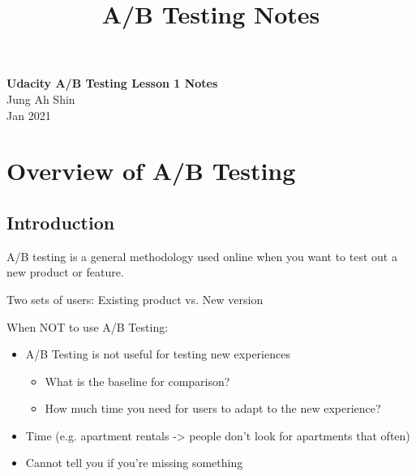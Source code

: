 \documentclass[10pt]{article}
\theoremstyle{definition}
\begin{document}
\setcounter{section}{0}
\title{A/B Testing Notes}

\thispagestyle{empty}

\begin{center}
{\LARGE \bf Udacity A/B Testing Lesson 1 Notes}\\
{\large Jung Ah Shin}\\
Jan 2021
\end{center}
\section{Overview of A/B Testing}
\subsection{Introduction}
A/B testing is a general methodology used online when you want to test out a new product or feature.

Two sets of users: Existing product vs. New version 

When NOT to use A/B Testing:
\begin{itemize}
\item A/B Testing is not useful for testing new experiences
\begin{itemize}
\item What is the baseline for comparison?
\item How much time you need for users to adapt to the new experience?
\end{itemize}
\item Time (e.g. apartment rentals -> people don't look for apartments that often) 
\item Cannot tell you if you're missing something
\end{itemize}
\end{document}
